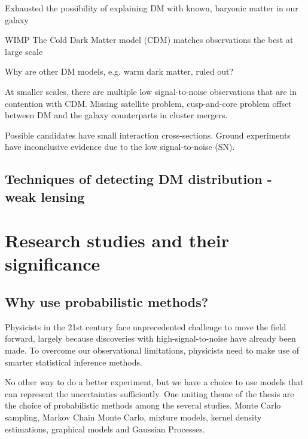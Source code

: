 \documentclass[ucdthesis.tex]{subfiles}
\begin{document}
		Exhausted the possibility of explaining DM with known, baryonic matter in
		our galaxy  


		WIMP 
		The Cold Dark Matter model (CDM) matches observations the best at large scale

		Why are other DM models, e.g. warm dark matter, ruled out?

		At smaller scales, there are multiple low signal-to-noise observations that 
		are in contention with CDM. Missing satellite problem, cusp-and-core problem 
		offset between DM and the galaxy counterparts in cluster mergers.

		Possible candidates have small interaction cross-sections. 
		Ground  experiments have inconclusive evidence due to the low
		signal-to-noise (SN).

		\subsection{Techniques of detecting DM distribution - weak lensing}

		\section{Research studies and their significance}
		\subsection{Why use probabilistic methods?}
		Physicists in the 21st century face unprecedented challenge to move the
		field forward, largely because discoveries with high-signal-to-noise have
		already been made.   
		To overcome our observational limitations, physicists need to make use of
		smarter statistical inference methods.


		No other way to do a better experiment, but we have a choice to use models
		that can represent the uncertainties sufficiently.
		One uniting theme of the thesis are the choice of probabilistic methods
		among the several studies. Monte Carlo sampling, Markov Chain Monte Carlo, 
		mixture models, kernel density estimations, graphical models and 
		Gaussian Processes. 
\end{document}
